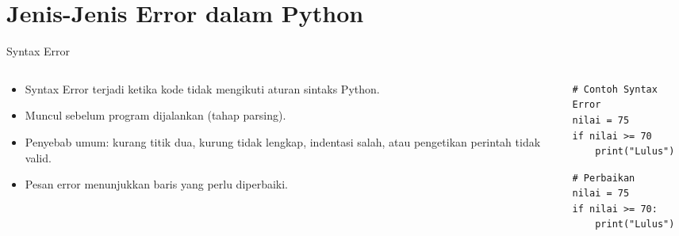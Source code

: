 \documentclass[aspectratio=169, table]{beamer}
\begin{document}
\section{Jenis-Jenis Error dalam Python}

\begin{frame}[fragile]{Syntax Error}
\vspace{20pt}

\begin{columns}[T]
    \begin{column}{0.40\linewidth}
        \begin{itemize}
            \item Syntax Error terjadi ketika kode tidak mengikuti aturan sintaks Python.
            \item Muncul sebelum program dijalankan (tahap parsing).
            \item Penyebab umum: kurang titik dua, kurung tidak lengkap, indentasi salah, atau pengetikan perintah tidak valid.
            \item Pesan error menunjukkan baris yang perlu diperbaiki.
        \end{itemize}
    \end{column}

    \begin{column}{0.55\linewidth}
\begin{lstlisting}[style=PythonStyle, basicstyle=\ttfamily\scriptsize]
# Contoh Syntax Error
nilai = 75
if nilai >= 70
    print("Lulus")
\end{lstlisting}

\begin{lstlisting}[style=PythonStyle, basicstyle=\ttfamily\scriptsize]
# Perbaikan
nilai = 75
if nilai >= 70:
    print("Lulus")
\end{lstlisting}
    \end{column}
\end{columns}

\end{frame}
\end{document}
